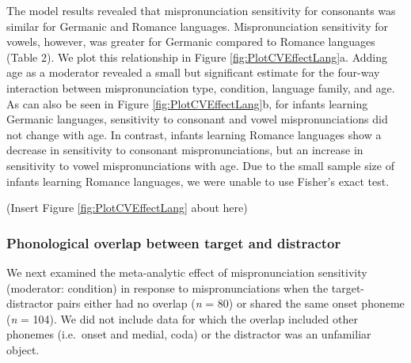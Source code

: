 \documentclass[
  man, noextraspace]{apa6}
\begin{document}
The model results revealed that mispronunciation sensitivity for consonants was similar for Germanic and Romance languages. Mispronunciation sensitivity for vowels, however, was greater for Germanic compared to Romance languages (Table 2). We plot this relationship in Figure \ref{fig:PlotCVEffectLang}a. Adding age as a moderator revealed a small but significant estimate for the four-way interaction between mispronunciation type, condition, language family, and age. As can also be seen in Figure \ref{fig:PlotCVEffectLang}b, for infants learning Germanic languages, sensitivity to consonant and vowel mispronunciations did not change with age. In contrast, infants learning Romance languages show a decrease in sensitivity to consonant mispronunciations, but an increase in sensitivity to vowel mispronunciations with age. Due to the small sample size of infants learning Romance languages, we were unable to use Fisher's exact test.

(Insert Figure \ref{fig:PlotCVEffectLang} about here)

\hypertarget{phonological-overlap-between-target-and-distractor}{%
\subsubsection{Phonological overlap between target and distractor}\label{phonological-overlap-between-target-and-distractor}}

We next examined the meta-analytic effect of mispronunciation sensitivity (moderator: condition) in response to mispronunciations when the target-distractor pairs either had no overlap (\emph{n} = 80) or shared the same onset phoneme (\emph{n} = 104). We did not include data for which the overlap included other phonemes (i.e.~onset and medial, coda) or the distractor was an unfamiliar object.
\end{document}
